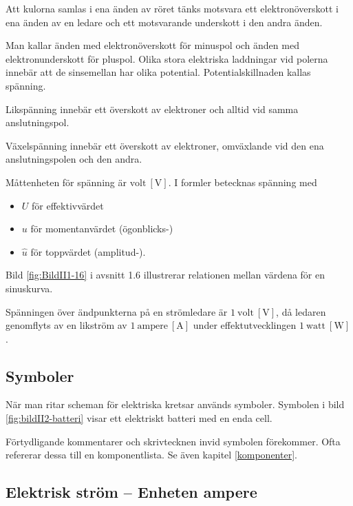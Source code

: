 Att kulorna samlas i ena änden av röret tänks motsvara ett elektronöverskott i
ena änden av en ledare och ett motsvarande underskott i den andra änden.

Man kallar änden med elektronöverskott för minuspol och änden med
elektronunderskott för pluspol.
Olika stora elektriska laddningar vid polerna innebär att de sinsemellan har
olika potential.
Potentialskillnaden kallas spänning.

Likspänning innebär ett överskott av elektroner och alltid vid samma
anslutningspol.

Växelspänning innebär ett överskott av elektroner, omväxlande vid den ena
anslutningspolen och den andra.

Måttenheten för spänning är \(\mathrm{volt\ [V]}\).
I formler betecknas spänning med
\begin{itemize}
  \item \(U\) för effektivvärdet
  \item \(u\) för momentanvärdet (ögonblicks-)
  \item \(\hat{u}\) för toppvärdet (amplitud-).
\end{itemize}
Bild \ref{fig:BildII1-16} i avsnitt 1.6 illustrerar relationen mellan värdena
för en sinuskurva.

Spänningen över ändpunkterna på en strömledare är \(1\ \mathrm{volt\ [V]}\), då
ledaren genomflyts av en likström av \(1\ \mathrm{ampere\ [A]}\) under
effektutvecklingen \(1\ \mathrm{watt\ [W]}\).

\subsection{Symboler}
\label{spänning.symboler}


\frdjp

När man ritar scheman för elektriska kretsar används symboler.
Symbolen i bild \ref{fig:bildII2-batteri} visar ett elektriskt batteri med en
enda cell.

Förtydligande kommentarer och skrivtecknen invid symbolen förekommer.
Ofta refererar dessa till en komponentlista.
Se även kapitel \ref{komponenter}.

\subsection{Elektrisk ström -- Enheten ampere}
\label{elektrisk_ström}

